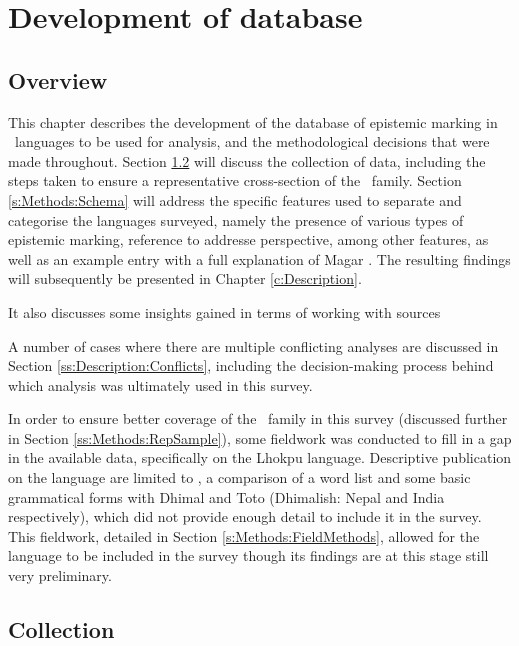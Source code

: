 \chapter{Development of database}\label{c:Methods}
\section{Overview}
This chapter describes the development of the database of epistemic marking in \lfam\ languages to be used for analysis, and the methodological decisions that were made throughout. Section \ref{s:Methods:Collection} will discuss the collection of data, including the steps taken to ensure a representative cross-section of the \lfam\ family. Section \ref{s:Methods:Schema} will address the specific features used to separate and categorise the languages surveyed, namely the presence of various types of epistemic marking, reference to addresse perspective, among other features, as well as an example entry with a full explanation of Magar \cite[Magaric: Nepal][]{GrunowHarsta2008}. The resulting findings will subsequently be presented in Chapter \ref{c:Description}.

It also discusses some insights gained in terms of working with sources

A number of cases where there are multiple conflicting analyses are discussed in Section \ref{ss:Description:Conflicts}, including the decision-making process behind which analysis was ultimately used in this survey. 

In order to ensure better coverage of the \lfam\ family in this survey (discussed further in Section \ref{ss:Methods:RepSample}), some fieldwork was conducted to fill in a gap in the available data, specifically on the Lhokpu language. Descriptive publication on the language are limited to , a comparison of a word list and some basic grammatical forms with Dhimal and Toto (Dhimalish: Nepal and India respectively), which did not provide enough detail to include it in the survey. This fieldwork, detailed in Section \ref{s:Methods:FieldMethods}, allowed for the language to be included in the survey though its findings are at this stage still very preliminary.  

\section{Collection}\label{s:Methods:Collection}
